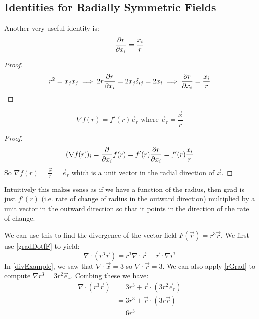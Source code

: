 \documentclass[../main.tex]{subfiles}
\begin{document}
\subsection{Identities for Radially Symmetric Fields}
\label{radialIdentities}
\begin{proposition}
  Another very useful identity is:
  \[
    \pderiv{r}{x_i} = \frac{x_i}{r}
  \]
\end{proposition}
\begin{proof}
  \[
    r^2 = x_j x_j \implies 2r \pderiv{r}{x_i} = 2x_j \delta_{i j} = 2x_i \implies \pderiv{r}{x_i} = \frac{x_i}{r}
  \]
\end{proof}
\begin{corollary}
  \[
    \nabla f(r) = f'(r)\vec{e}_r \text{ where } \vec{e}_r = \frac{\vec{x}}{r}
  \]
  \label{rGrad}
\end{corollary}
\begin{proof}
  \[
    (\nabla f(r))_i = \pderiv{}{x_i}f(r) = f'(r) \pderiv{r}{x_i} = f'(r) \frac{x_i}{r}
  \]
  So $\nabla f(r) = \frac{\vec{x}}{r} = \vec{e}_r$ which is a unit vector in the radial direction of $\vec{x}$.
\end{proof}
Intuitively this makes sense as if we have a function of the radius, then grad is just $f'(r)$ (i.e. rate of change of radius in the outward direction) multiplied by a unit vector in the outward direction so that it points in the direction of the rate of change.
\begin{example}
  We can use this to find the divergence of the vector field $F(\vec{r}) = r^3 \vec{r}$.
  We first use \cref{gradDotfF} to yield:
  \[
    \nabla \cdot (r^3 \vec{r}) = r^3 \nabla \cdot \vec{r} + \vec{r} \cdot \nabla r^3
  \]
  In \cref{divExample}, we saw that $\nabla \cdot \vec{x} = 3$ so $\nabla \cdot \vec{r} = 3$.
  We can also apply \cref{rGrad} to compute $\nabla r^3 = 3r^2 \vec{e}_r$.
  Combing these we have:
  \begin{align*}
    \nabla \cdot (r^3 \vec{r}) &= 3r^3 + \vec{r} \cdot (3r^2 \vec{e}_r) \\
                               &= 3r^3 + \vec{r} \cdot (3r\vec{r}) \\
                               &= 6r^3
  \end{align*}
\end{example}
\end{document}
